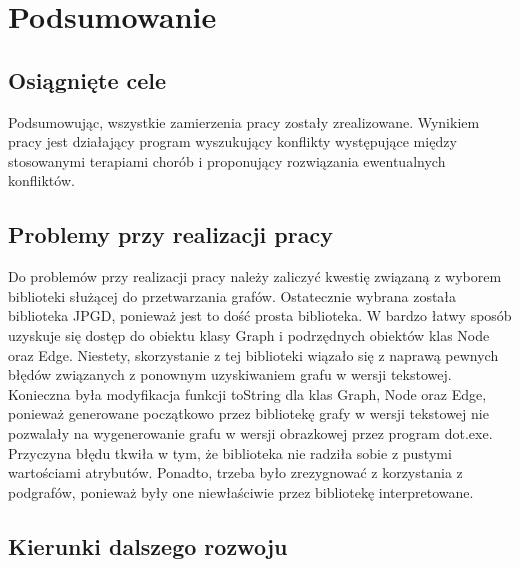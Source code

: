 \chapter{Podsumowanie}

\section{Osiągnięte cele}

Podsumowując, wszystkie zamierzenia pracy zostały zrealizowane. Wynikiem pracy jest działający program wyszukujący konflikty występujące między stosowanymi terapiami chorób i proponujący rozwiązania ewentualnych konfliktów. 

\section{Problemy przy realizacji pracy}
Do problemów przy realizacji pracy należy zaliczyć kwestię związaną z wyborem biblioteki służącej do przetwarzania grafów. Ostatecznie wybrana została biblioteka JPGD, ponieważ jest to dość prosta biblioteka. W bardzo łatwy sposób uzyskuje się dostęp do obiektu klasy Graph i podrzędnych obiektów klas Node oraz Edge. Niestety, skorzystanie z tej biblioteki wiązało się z naprawą pewnych błędów związanych z ponownym uzyskiwaniem grafu w wersji tekstowej. Konieczna była modyfikacja funkcji toString dla klas Graph, Node oraz Edge, ponieważ generowane początkowo przez bibliotekę grafy w wersji tekstowej nie pozwalały na wygenerowanie grafu w wersji obrazkowej przez program dot.exe. Przyczyna błędu tkwiła w tym, że biblioteka nie radziła sobie z pustymi wartościami atrybutów. Ponadto, trzeba było zrezygnować z korzystania z podgrafów, ponieważ były one niewłaściwie przez bibliotekę interpretowane.

\section{Kierunki dalszego rozwoju}


